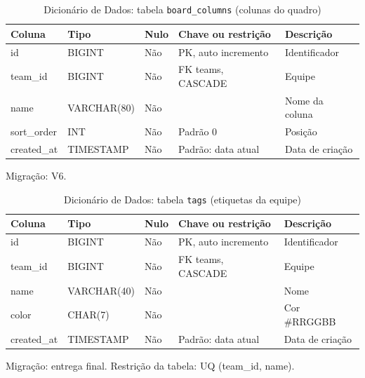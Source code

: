 \begin{table}[H]
\centering
\footnotesize
\caption{Dicionário de Dados: tabela \texttt{board\_\allowbreak{}columns} (colunas do quadro)}
\label{tab:dd-board-columns}
\begin{tabular}{|>{\raggedright\arraybackslash}p{3.0cm}|>{\raggedright\arraybackslash}p{3.2cm}|>{\centering\arraybackslash}p{0.8cm}|>{\raggedright\arraybackslash}p{3.0cm}|>{\raggedright\arraybackslash}p{3.8cm}|}
\hline
\textbf{Coluna} & \textbf{Tipo} & \textbf{Nulo} & \textbf{Chave ou restrição} & \textbf{Descrição} \\
\hline
id & BIGINT & Não & PK, auto incremento & Identificador \\
\hline
team\_\allowbreak{}id & BIGINT & Não & FK teams, CASCADE & Equipe \\
\hline
name & VARCHAR(80) & Não &  & Nome da coluna \\
\hline
sort\_\allowbreak{}order & INT & Não & Padrão 0 & Posição \\
\hline
created\_\allowbreak{}at & TIMESTAMP & Não & Padrão: data atual & Data de criação \\
\hline
\end{tabular}
\par\footnotesize Migração: V6.
\end{table}

\begin{table}[H]
\centering
\footnotesize
\caption{Dicionário de Dados: tabela \texttt{tags} (etiquetas da equipe)}
\label{tab:dd-tags}
\begin{tabular}{|>{\raggedright\arraybackslash}p{3.0cm}|>{\raggedright\arraybackslash}p{3.2cm}|>{\centering\arraybackslash}p{0.8cm}|>{\raggedright\arraybackslash}p{3.0cm}|>{\raggedright\arraybackslash}p{3.8cm}|}
\hline
\textbf{Coluna} & \textbf{Tipo} & \textbf{Nulo} & \textbf{Chave ou restrição} & \textbf{Descrição} \\
\hline
id & BIGINT & Não & PK, auto incremento & Identificador \\
\hline
team\_\allowbreak{}id & BIGINT & Não & FK teams, CASCADE & Equipe \\
\hline
name & VARCHAR(40) & Não &  & Nome \\
\hline
color & CHAR(7) & Não &  & Cor \#RRGGBB \\
\hline
created\_\allowbreak{}at & TIMESTAMP & Não & Padrão: data atual & Data de criação \\
\hline
\end{tabular}
\par\footnotesize Migração: entrega final. Restrição da tabela: UQ (team\_\allowbreak{}id, name).
\end{table}

